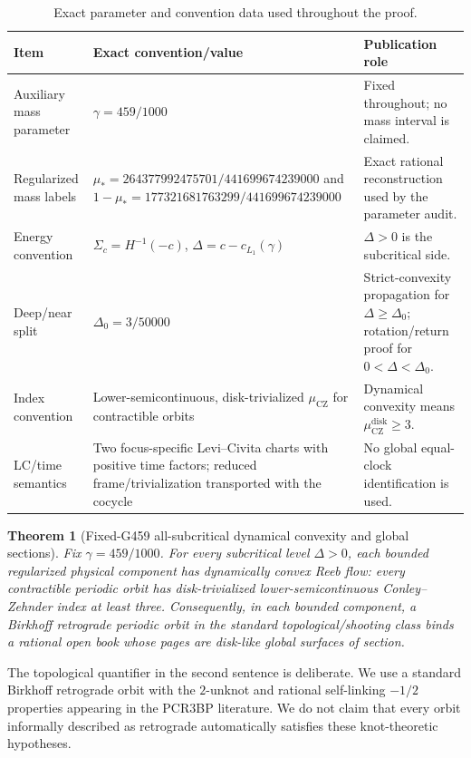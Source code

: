 \documentclass[11pt]{article}
\newtheorem{theorem}{Theorem}[section]
\begin{document}
\begin{table}[ht]
\centering
\small
\caption{Exact parameter and convention data used throughout the proof.}
\label{tab:parameter-conventions}
\begin{tabularx}{\textwidth}{@{}>{\raggedright\arraybackslash}p{} X >{\raggedright\arraybackslash}p{}@{}}
\toprule
Item & Exact convention/value & Publication role \\
\midrule
Auxiliary mass parameter & $\gamma=459/1000$ & Fixed throughout; no mass interval is claimed. \\
Regularized mass labels & $\mu_*=264377992475701/441699674239000$ and $1-\mu_*=177321681763299/441699674239000$ & Exact rational reconstruction used by the parameter audit. \\
Energy convention & $\Sigma_c=H^{-1}(-c)$, $\Delta=c-c_{L_1}(\gamma)$ & $\Delta>0$ is the subcritical side. \\
Deep/near split & $\Delta_0=3/50000$ & Strict-convexity propagation for $\Delta\ge\Delta_0$; rotation/return proof for $0<\Delta<\Delta_0$. \\
Index convention & Lower-semicontinuous, disk-trivialized $\mu_{\mathrm{CZ}}$ for contractible orbits & Dynamical convexity means $\mu_{\mathrm{CZ}}^{\mathrm{disk}}\ge3$. \\
LC/time semantics & Two focus-specific Levi--Civita charts with positive time factors; reduced frame/trivialization transported with the cocycle & No global equal-clock identification is used. \\
\bottomrule
\end{tabularx}
\end{table}

\begin{theorem}[Fixed-G459 all-subcritical dynamical convexity and global sections]\label{thm:main}
Fix $\gamma=459/1000$. For every subcritical level $\Delta>0$, each bounded regularized physical component has dynamically convex Reeb flow: every contractible periodic orbit has disk-trivialized lower-semicontinuous Conley--Zehnder index at least three. Consequently, in each bounded component, a Birkhoff retrograde periodic orbit in the standard topological/shooting class binds a rational open book whose pages are disk-like global surfaces of section.
\end{theorem}

The topological quantifier in the second sentence is deliberate. We use a standard Birkhoff retrograde orbit with the $2$-unknot and rational self-linking $-1/2$ properties appearing in the PCR3BP literature. We do not claim that every orbit informally described as retrograde automatically satisfies these knot-theoretic hypotheses.
\end{document}
